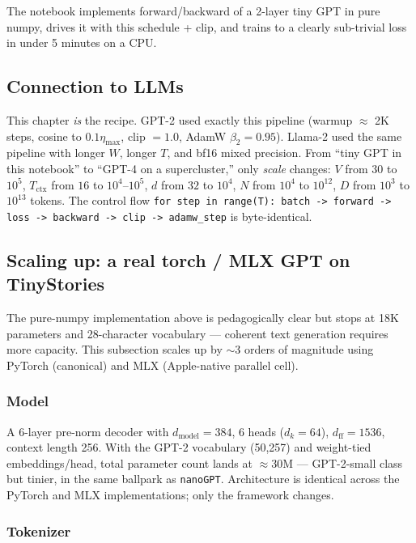 \documentclass[11pt]{article}
\theoremstyle{remark}
\begin{document}
The notebook implements forward/backward of a 2-layer tiny GPT in pure numpy, drives it with this schedule + clip, and trains to a clearly sub-trivial loss in under 5 minutes on a CPU.

\subsection*{Connection to LLMs}

This chapter \emph{is} the recipe. GPT-2 used exactly this pipeline (warmup $\approx$ 2K steps, cosine to $0.1\eta_{\max}$, clip $=1.0$, AdamW $\beta_2=0.95$). Llama-2 used the same pipeline with longer $W$, longer $T$, and bf16 mixed precision. From ``tiny GPT in this notebook'' to ``GPT-4 on a supercluster,'' only \emph{scale} changes: $V$ from $30$ to $10^5$, $T_{\text{ctx}}$ from $16$ to $10^4$--$10^5$, $d$ from $32$ to $10^4$, $N$ from $10^4$ to $10^{12}$, $D$ from $10^3$ to $10^{13}$ tokens. The control flow \texttt{for step in range(T): batch -> forward -> loss -> backward -> clip -> adamw\_step} is byte-identical.

\subsection*{Scaling up: a real torch / MLX GPT on TinyStories}

The pure-numpy implementation above is pedagogically clear but stops at 18K parameters and 28-character vocabulary --- coherent text generation requires more capacity. This subsection scales up by $\sim$3 orders of magnitude using PyTorch (canonical) and MLX (Apple-native parallel cell).

\subsubsection*{Model}

A 6-layer pre-norm decoder with $d_{\text{model}}=384$, 6 heads ($d_k=64$), $d_{\text{ff}}=1536$, context length 256. With the GPT-2 vocabulary (50{,}257) and weight-tied embeddings/head, total parameter count lands at $\approx 30$M --- GPT-2-small class but tinier, in the same ballpark as \texttt{nanoGPT}. Architecture is identical across the PyTorch and MLX implementations; only the framework changes.

\subsubsection*{Tokenizer}
\end{document}
